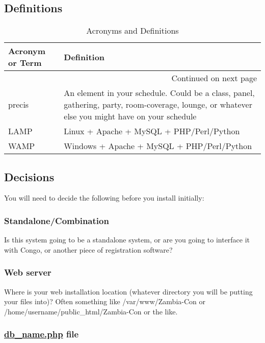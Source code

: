 \documentclass[captions=tablesignature]{scrartcl}
\begin{document}
\subsection{Definitions}
\label{sec-1-1}
\begin{longtable}{|p{3.5cm}|p{13.4cm}|}
\caption{\label{tbl:acronymsdefinitions}Acronyms and Definitions}
\\
\hline
Acronym or Term & Definition\\
\hline
\endhead
\hline\multicolumn{2}{r}{Continued on next page} \\
\endfoot
\endlastfoot
precis & An element in your schedule.  Could be a class, panel, gathering, party, room-coverage, lounge, or whatever else you might have on your schedule\\
LAMP & Linux + Apache + MySQL + PHP/Perl/Python\\
WAMP & Windows + Apache + MySQL + PHP/Perl/Python\\
\hline
\end{longtable}
\subsection{Decisions}
\label{sec-1-2}

You will need to decide the following before you install initially:
\subsubsection{Standalone/Combination}
\label{sec-1-2-1}

Is this system going to be a standalone system, or are you going
to interface it with Congo, or another piece of registration software?

\subsubsection{Web server}
\label{sec-1-2-2}

Where is your web installation location (whatever directory you
will be putting your files into)?  Often something like
/var/www/Zambia-Con or /home/username/public\_html/Zambia-Con or
the like.

\subsubsection{\href{../Local/db_name.php}{db\_name.php} file}
\label{sec-1-2-3}
\end{document}
